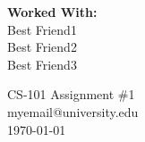 \documentclass[11pt]{article}
\makeatletter
\newcommand{\myemail}{myemail@university.edu}
\newcommand{\myclass}{CS-101 }
\newcommand{\myhwnum}{\#1}
\makeatother
\begin{document}
\thispagestyle{plain}
\begin{flushright}
  \textbf{Worked With:}\\
  Best Friend1\\
  Best Friend2\\
  Best Friend3\\
\end{flushright}

\begin{center}                                      %
  {\Large \myclass Assignment \myhwnum} \\
  \myemail\\
  \today\\
\end{center}
\end{document}
